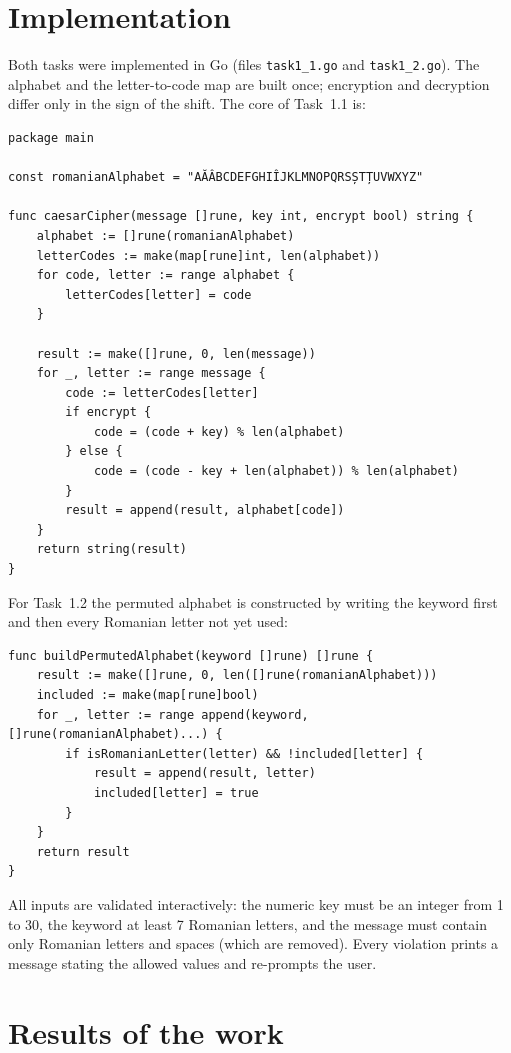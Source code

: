 \documentclass[12pt,a4paper]{article}
\begin{document}
\section{Implementation}

Both tasks were implemented in Go (files \texttt{task1\_1.go} and \texttt{task1\_2.go}). The alphabet and the letter-to-code map are built once; encryption and decryption differ only in the sign of the shift. The core of Task~1.1 is:

\begin{lstlisting}[style=go,caption={Classic Caesar cipher over the 31-letter Romanian alphabet (\texttt{task1\_1.go})}]
package main

const romanianAlphabet = "AĂÂBCDEFGHIÎJKLMNOPQRSȘTȚUVWXYZ"

func caesarCipher(message []rune, key int, encrypt bool) string {
	alphabet := []rune(romanianAlphabet)
	letterCodes := make(map[rune]int, len(alphabet))
	for code, letter := range alphabet {
		letterCodes[letter] = code
	}

	result := make([]rune, 0, len(message))
	for _, letter := range message {
		code := letterCodes[letter]
		if encrypt {
			code = (code + key) % len(alphabet)
		} else {
			code = (code - key + len(alphabet)) % len(alphabet)
		}
		result = append(result, alphabet[code])
	}
	return string(result)
}
\end{lstlisting}

For Task~1.2 the permuted alphabet is constructed by writing the keyword first and then every Romanian letter not yet used:

\begin{lstlisting}[style=go,caption={Construction of the keyword-permuted alphabet (\texttt{task1\_2.go})}]
func buildPermutedAlphabet(keyword []rune) []rune {
	result := make([]rune, 0, len([]rune(romanianAlphabet)))
	included := make(map[rune]bool)
	for _, letter := range append(keyword, []rune(romanianAlphabet)...) {
		if isRomanianLetter(letter) && !included[letter] {
			result = append(result, letter)
			included[letter] = true
		}
	}
	return result
}
\end{lstlisting}

All inputs are validated interactively: the numeric key must be an integer from 1 to 30, the keyword at least 7 Romanian letters, and the message must contain only Romanian letters and spaces (which are removed). Every violation prints a message stating the allowed values and re-prompts the user.

\section{Results of the work}
\end{document}
